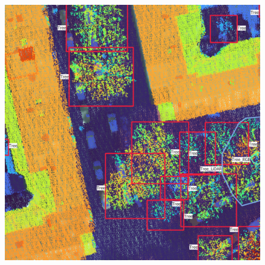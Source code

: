 \documentclass[
  letterpaper,
  DIV=11,
  numbers=noendperiod]{scrartcl}
\begin{document}
\begin{figure}
\begin{minipage}{0.48\linewidth}
\end{minipage}%
\newline
\begin{minipage}{\linewidth}
~\end{minipage}%
\newline
\begin{minipage}{0.48\linewidth}

\includegraphics{images/Training_image/LiDAR.png}

\end{minipage}%
%
\begin{minipage}{0.04\linewidth}
~\end{minipage}%
%
\begin{minipage}{0.48\linewidth}


\end{minipage}
\end{figure}
\end{document}
